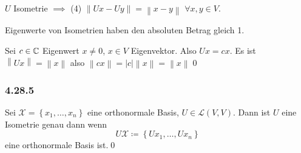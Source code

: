 \begin{subnote}
	$ U $ Isometrie $ \implies $ (4) $ \left\| Ux - Uy \right\| = \left\| x - y \right\|  $ $ \forall x, y \in V $.
\end{subnote}

\begin{subtheorem}
	Eigenwerte von Isometrien haben den absoluten Betrag gleich 1.
\end{subtheorem}
\begin{subproof*}
	Sei $ c \in \mathbb{C}  $ Eigenwert $ x \neq 0 $, $ x \in V $ Eigenvektor.
	Also $ Ux = cx $. Es ist $ \left\| Ux \right\| = \left\| x \right\|  $ also $ \left\| cx \right\| = \left| c \right| \left\| x \right\| = \left\| x \right\|  $\qed
\end{subproof*}

\subsubsection{4.28.5}
Sei $ \mathcal{X} = \left\{ x_1, \dotsc, x_n \right\}  $ eine orthonormale Basis, $ U \in \mathcal{L} (V, V) $.
Dann ist $ U $ eine Isometrie genau dann wenn
\[
	U \mathcal{X} \coloneqq \left\{ Ux_1, \dotsc, Ux_n \right\} 
\]
eine orthonormale Basis ist.\qed

